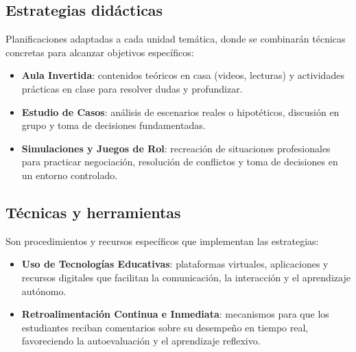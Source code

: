 \subsection*{Estrategias didácticas}
Planificaciones adaptadas a cada unidad temática, donde se combinarán técnicas concretas para alcanzar objetivos específicos:
\begin{itemize}[leftmargin=*, itemsep=0.6em]
    \item \textbf{Aula Invertida}: contenidos teóricos en casa (videos, lecturas) y actividades prácticas en clase para resolver dudas y profundizar.
    \item \textbf{Estudio de Casos}: análisis de escenarios reales o hipotéticos, discusión en grupo y toma de decisiones fundamentadas.
    \item \textbf{Simulaciones y Juegos de Rol}: recreación de situaciones profesionales para practicar negociación, resolución de conflictos y toma de decisiones en un entorno controlado.
\end{itemize}

\subsection*{Técnicas y herramientas}
Son procedimientos y recursos específicos que implementan las estrategias:
\begin{itemize}[leftmargin=*, itemsep=0.6em]
    \item \textbf{Uso de Tecnologías Educativas}: plataformas virtuales, aplicaciones y recursos digitales que facilitan la comunicación, la interacción y el aprendizaje autónomo.
    \item \textbf{Retroalimentación Continua e Inmediata}: mecanismos para que los estudiantes reciban comentarios sobre su desempeño en tiempo real, favoreciendo la autoevaluación y el aprendizaje reflexivo.
\end{itemize}
\pagebreak